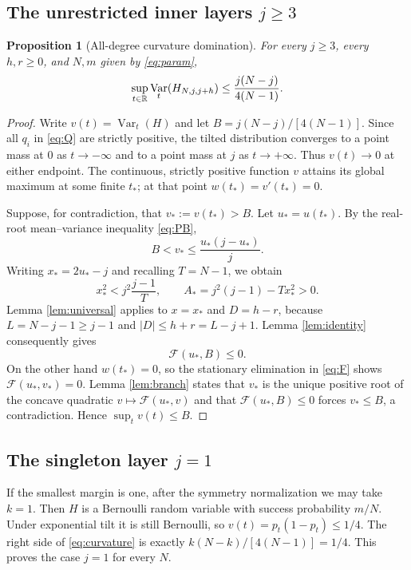 \documentclass[11pt,a4paper]{article}
\newtheorem{proposition}[theorem]{Proposition}
\DeclareMathOperator{\Var}{Var}\DeclareMathOperator{\Cov}{Cov}\DeclareMathOperator{\Hyp}{Hyp}\DeclareMathOperator{\Bern}{Bern}\DeclareMathOperator{\supp}{supp}\DeclareMathOperator{\artanh}{artanh}
\begin{document}
\subsection{The unrestricted inner layers \texorpdfstring{$j\ge3$}{j >= 3}}
\begin{proposition}[All-degree curvature domination]\label{prop:allinner}
For every $j\ge3$, every $h,r\ge0$, and $N,m$ given by \eqref{eq:param},
\begin{equation}\label{eq:allinner}
 \sup_{t\in\R}\Var_t(H_{N,j,j+h})\le\frac{j(N-j)}{4(N-1)}.
\end{equation}
\end{proposition}
\begin{proof}
Write $v(t)=\Var_t(H)$ and let $B=j(N-j)/[4(N-1)]$. Since all $q_i$ in \eqref{eq:Q} are strictly positive, the tilted distribution converges to a point mass at $0$ as $t\to-\infty$ and to a point mass at $j$ as $t\to+\infty$. Thus $v(t)\to0$ at either endpoint. The continuous, strictly positive function $v$ attains its global maximum at some finite $t_*$; at that point $w(t_*)=v'(t_*)=0$.

Suppose, for contradiction, that $v_*:=v(t_*)>B$. Let $u_*=u(t_*)$. By the real-root mean--variance inequality \eqref{eq:PB},
\[
 B<v_*\le\frac{u_*(j-u_*)}{j}.
\]
Writing $x_*=2u_*-j$ and recalling $T=N-1$, we obtain
\[
 x_*^2<j^2\frac{j-1}{T},\qquad
 A_*=j^2(j-1)-Tx_*^2>0.
\]
Lemma \ref{lem:universal} applies to $x=x_*$ and $D=h-r$, because $L=N-j-1\ge j-1$ and $|D|\le h+r=L-j+1$. Lemma \ref{lem:identity} consequently gives
\[
 \mathcal F(u_*,B)\le0.
\]
On the other hand $w(t_*)=0$, so the stationary elimination in \eqref{eq:F} shows $\mathcal F(u_*,v_*)=0$. Lemma \ref{lem:branch} states that $v_*$ is the unique positive root of the concave quadratic $v\mapsto\mathcal F(u_*,v)$ and that $\mathcal F(u_*,B)\le0$ forces $v_*\le B$, a contradiction. Hence $\sup_t v(t)\le B$.
\end{proof}

\subsection{The singleton layer \texorpdfstring{$j=1$}{j = 1}}
If the smallest margin is one, after the symmetry normalization we may take $k=1$. Then $H$ is a Bernoulli random variable with success probability $m/N$. Under exponential tilt it is still Bernoulli, so $v(t)=p_t(1-p_t)\le1/4$. The right side of \eqref{eq:curvature} is exactly $k(N-k)/[4(N-1)]=1/4$. This proves the case $j=1$ for every $N$.
\end{document}
